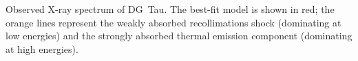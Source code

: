 \label{fig:fit}
Observed X-ray spectrum of DG~Tau. The best-fit model is shown in red; the orange lines represent the weakly absorbed recollimations shock (dominating at low energies) and the strongly absorbed thermal emission component (dominating at high energies).